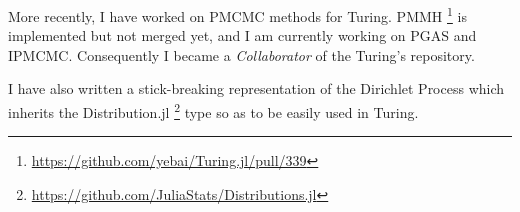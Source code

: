 More recently, I have worked on \gls{PMCMC} methods for Turing. \Gls{PMMH} \footnote{\url{https://github.com/yebai/Turing.jl/pull/339}} is implemented but not merged yet, and I am currently working on \gls{PGAS} and \gls{IPMCMC}. Consequently I became a \textit{Collaborator} of the Turing's repository.

I have also written a stick-breaking representation of the Dirichlet Process which inherits the Distribution.jl \footnote{\url{https://github.com/JuliaStats/Distributions.jl}} type so as to be easily used in Turing.
